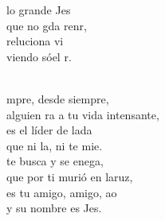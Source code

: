 \documentclass[12pt]{article}
\begin{document}
\begin{multicols*}{2}
\begin{cancion}
\jump
	 lo grande Jes  \\
	 que no gda renr,\\
	reluciona  vi\\
	viendo sóel r.\\\jump\\
	\begin{chorus}%
	mpre, desde siempre,\\
	alguien ra a tu vida intensante,\\
	es el líder de lada\\
	que ni la, ni te mie.\\
\jump
	 te busca y se enega,\\
	que por ti murió en laruz,\\
	es tu amigo, amigo, ao\\
	y su nombre es Jes.\\
	\end{chorus}%
	\jump\\
	       \\
\end{cancion}%


\end{multicols*}
\end{document}
